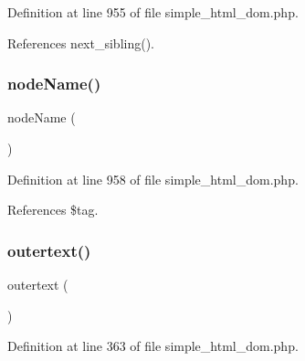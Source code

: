 Definition at line 955 of file simple\+\_\+html\+\_\+dom.\+php.



References next\+\_\+sibling().


\hypertarget{classsimple__html__dom__node_afd68aa0cdee9735a7b13891300f4891b}{}\label{classsimple__html__dom__node_afd68aa0cdee9735a7b13891300f4891b} 
\subsubsection{\texorpdfstring{node\+Name()}{nodeName()}}
{\footnotesize\ttfamily node\+Name (\begin{DoxyParamCaption}{ }\end{DoxyParamCaption})}



Definition at line 958 of file simple\+\_\+html\+\_\+dom.\+php.



References \$tag.


\hypertarget{classsimple__html__dom__node_a64d25961093a3b4c7b9b26a6d56c5831}{}\label{classsimple__html__dom__node_a64d25961093a3b4c7b9b26a6d56c5831} 
\subsubsection{\texorpdfstring{outertext()}{outertext()}}
{\footnotesize\ttfamily outertext (\begin{DoxyParamCaption}{ }\end{DoxyParamCaption})}



Definition at line 363 of file simple\+\_\+html\+\_\+dom.\+php.



